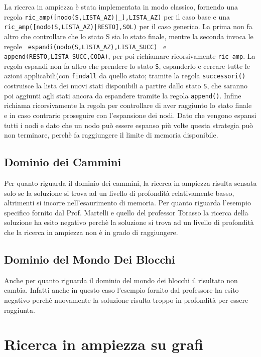 La ricerca in ampiezza è stata implementata in modo classico, fornendo una regola \lstinline{ric_amp([nodo(S,LISTA_AZ)|_],LISTA_AZ)} per il caso base e una \lstinline{ric_amp([nodo(S,LISTA_AZ)|RESTO],SOL)} per il caso generico.
La prima non fa altro che controllare che lo stato S sia lo stato finale, mentre la seconda invoca le regole \lstinline{ espandi(nodo(S,LISTA_AZ),LISTA_SUCC) } e \lstinline{append(RESTO,LISTA_SUCC,CODA)}, per poi richiamare ricorsivamente \lstinline{ric_amp}.
La regola espandi non fa altro che prendere lo stato \lstinline{S}, espanderlo e cercare tutte le azioni applicabili(con \lstinline{findall} da quello stato; tramite la regola \lstinline{successori()} costruisce la lista dei nuovi stati disponibili a partire dallo stato \lstinline{S}, che saranno poi aggiunti agli stati ancora da espandere tramite la regola \lstinline{append()}.
Infine richiama ricorsivamente la regola per controllare di aver raggiunto lo stato finale e in caso contrario proseguire con l'espansione dei nodi.
Dato che vengono espansi tutti i nodi e dato che un nodo può essere espanso più volte questa strategia può non terminare, perchè fa raggiungere il limite di memoria disponibile.

\subsection{Dominio dei Cammini}
Per quanto riguarda il dominio dei cammini, la ricerca in ampiezza risulta sensata solo se la soluzione si trova ad un livello di profondità relativamente basso, altrimenti si incorre nell'esaurimento di memoria. Per quanto riguarda l'esempio specifico fornito dal Prof. Martelli e quello del professor Torasso la ricerca della soluzione ha esito negativo perchè la soluzione si trova ad un livello di profondità che la ricerca in ampiezza non è in grado di raggiungere.

\subsection{Dominio del Mondo Dei Blocchi}
Anche per quanto riguarda il dominio del mondo dei blocchi il risultato non cambia. Infatti anche in questo caso l'esempio fornito dal professore ha esito negativo perchè nuovamente la soluzione risulta troppo in profondità per essere raggiunta.

\section{Ricerca in ampiezza su grafi}


